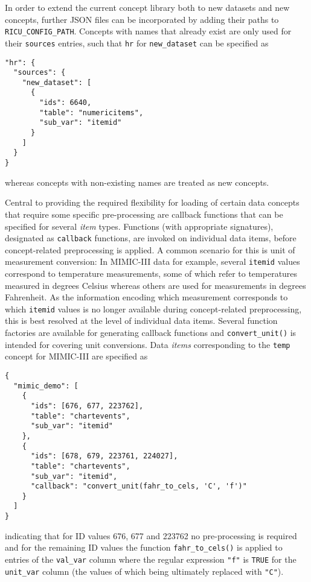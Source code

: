 \documentclass[
  notitle]{jss}
\begin{document}
In order to extend the current concept library both to new datasets and
new concepts, further JSON files can be incorporated by adding their
paths to \texttt{RICU\_CONFIG\_PATH}. Concepts with names that already
exist are only used for their \texttt{sources} entries, such that
\texttt{hr} for \texttt{new\_dataset} can be specified as

\begin{verbatim}
"hr": {
  "sources": {
    "new_dataset": [
      {
        "ids": 6640,
        "table": "numericitems",
        "sub_var": "itemid"
      }
    ]
  }
}
\end{verbatim}

whereas concepts with non-existing names are treated as new concepts.

Central to providing the required flexibility for loading of certain
data concepts that require some specific pre-processing are callback
functions that can be specified for several \emph{item} types. Functions
(with appropriate signatures), designated as \texttt{callback}
functions, are invoked on individual data items, before concept-related
preprocessing is applied. A common scenario for this is unit of
measurement conversion: In MIMIC-III data for example, several
\texttt{itemid} values correspond to temperature measurements, some of
which refer to temperatures measured in degrees Celsius whereas others
are used for measurements in degrees Fahrenheit. As the information
encoding which measurement corresponds to which \texttt{itemid} values
is no longer available during concept-related preprocessing, this is
best resolved at the level of individual data items. Several function
factories are available for generating callback functions and
\texttt{convert\_unit()} is intended for covering unit conversions. Data
\emph{items} corresponding to the \texttt{temp} concept for MIMIC-III
are specified as

\begin{verbatim}
{
  "mimic_demo": [
    {
      "ids": [676, 677, 223762],
      "table": "chartevents",
      "sub_var": "itemid"
    },
    {
      "ids": [678, 679, 223761, 224027],
      "table": "chartevents",
      "sub_var": "itemid",
      "callback": "convert_unit(fahr_to_cels, 'C', 'f')"
    }
  ]
}
\end{verbatim}

indicating that for ID values 676, 677 and 223762 no pre-processing is
required and for the remaining ID values the function
\texttt{fahr\_to\_cels()} is applied to entries of the \texttt{val\_var}
column where the regular expression \texttt{"f"} is \texttt{TRUE} for
the \texttt{unit\_var} column (the values of which being ultimately
replaced with \texttt{"C"}).
\end{document}
